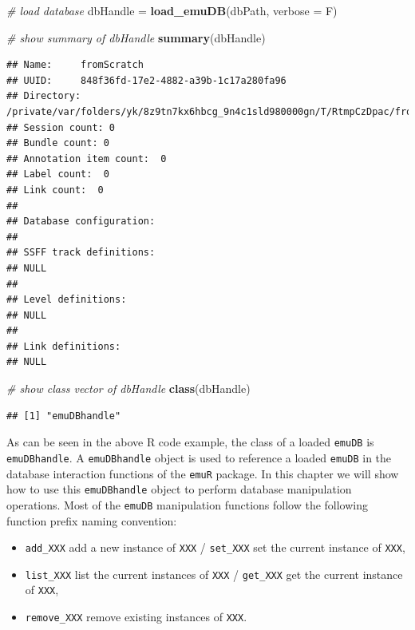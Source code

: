 \documentclass[]{book}
\newenvironment{Shaded}{\begin{snugshade}}{\end{snugshade}}
\newcommand{\CommentTok}[1]{\textcolor[rgb]{0.56,0.35,0.01}{\textit{#1}}}
\newcommand{\DataTypeTok}[1]{\textcolor[rgb]{0.13,0.29,0.53}{#1}}
\newcommand{\KeywordTok}[1]{\textcolor[rgb]{0.13,0.29,0.53}{\textbf{#1}}}
\newcommand{\NormalTok}[1]{#1}
\newcommand{\StringTok}[1]{\textcolor[rgb]{0.31,0.60,0.02}{#1}}
\providecommand{\tightlist}{%
  \setlength{\itemsep}{0pt}\setlength{\parskip}{0pt}}
\begin{document}
\begin{Shaded}
\begin{Highlighting}[]
\CommentTok{# load database}
\NormalTok{dbHandle =}\StringTok{ }\KeywordTok{load_emuDB}\NormalTok{(dbPath, }\DataTypeTok{verbose =}\NormalTok{ F)}

\CommentTok{# show summary of dbHandle}
\KeywordTok{summary}\NormalTok{(dbHandle)}
\end{Highlighting}
\end{Shaded}

\begin{verbatim}
## Name:     fromScratch 
## UUID:     848f36fd-17e2-4882-a39b-1c17a280fa96 
## Directory:    /private/var/folders/yk/8z9tn7kx6hbcg_9n4c1sld980000gn/T/RtmpCzDpac/fromScratch_emuDB 
## Session count: 0 
## Bundle count: 0 
## Annotation item count:  0 
## Label count:  0 
## Link count:  0 
## 
## Database configuration:
## 
## SSFF track definitions:
## NULL
## 
## Level definitions:
## NULL
## 
## Link definitions:
## NULL
\end{verbatim}

\begin{Shaded}
\begin{Highlighting}[]
\CommentTok{# show class vector of dbHandle}
\KeywordTok{class}\NormalTok{(dbHandle)}
\end{Highlighting}
\end{Shaded}

\begin{verbatim}
## [1] "emuDBhandle"
\end{verbatim}

As can be seen in the above R code example, the class of a loaded \texttt{emuDB} is \texttt{emuDBhandle}. A \texttt{emuDBhandle} object is used to reference a loaded \texttt{emuDB} in the database interaction functions of the \texttt{emuR} package. In this chapter we will show how to use this \texttt{emuDBhandle} object to perform database manipulation operations. Most of the \texttt{emuDB} manipulation functions follow the following function prefix naming convention:

\begin{itemize}
\tightlist
\item
  \texttt{add\_XXX} add a new instance of \texttt{XXX} / \texttt{set\_XXX} set the current instance of \texttt{XXX},
\item
  \texttt{list\_XXX} list the current instances of \texttt{XXX} / \texttt{get\_XXX} get the current instance of \texttt{XXX},
\item
  \texttt{remove\_XXX} remove existing instances of \texttt{XXX}.
\end{itemize}
\end{document}
